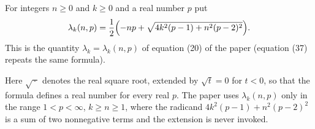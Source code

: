 \begin{definition}
For integers $n\ge0$ and $k\ge0$ and a real number $p$ put
\[
  \lambda_k(n,p)=\frac12\Bigl(-np+\sqrt{4k^2(p-1)+n^2(p-2)^2}\Bigr).
\]
This is the quantity $\lambda_k=\lambda_k(n,p)$ of equation (20) of the paper
(equation (37) repeats the same formula).

Here $\sqrt{\,\cdot\,}$ denotes the real square root, extended by $\sqrt t=0$
for $t<0$, so that the formula defines a real number for every real $p$.  The
paper uses $\lambda_k(n,p)$ only in the range $1<p<\infty$, $k\ge n\ge1$,
where the radicand $4k^2(p-1)+n^2(p-2)^2$ is a sum of two nonnegative terms
and the extension is never invoked.
\end{definition}
